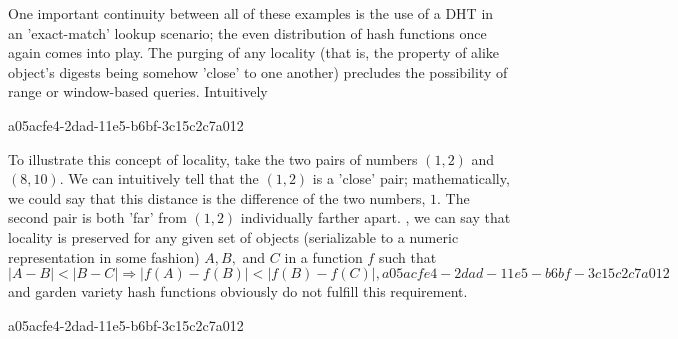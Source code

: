 \documentclass[12pt]{article}
\begin{document}
\par One important continuity between all of these examples is the use of a DHT in an 'exact-match' lookup scenario; the even distribution of hash functions once again comes into play. The purging of any locality (that is, the property of alike object's digests being somehow 'close' to one another) precludes the possibility of range or window-based queries. Intuitively

a05acfe4-2dad-11e5-b6bf-3c15c2c7a012\par To illustrate this concept of locality, take the two pairs of numbers $(1,2)$ and $(8,10)$. We can intuitively tell that the $(1,2)$ is a 'close' pair; mathematically, we could say that this distance is the difference of the two numbers, $1$. The second pair is both 'far' from $(1,2)$ individually farther apart. , we can say that locality is preserved for any given set of objects (serializable to a numeric representation in some fashion) $A,B,$ and $C$ in a function $f$ such that
\begin{equation}
|A-B| < |B-C| \Rightarrow |f(A)-f(B)| < |f(B) - f(C)|,
a05acfe4-2dad-11e5-b6bf-3c15c2c7a012\end{equation}
and garden variety hash functions obviously do not fulfill this requirement.

\printbibliography
a05acfe4-2dad-11e5-b6bf-3c15c2c7a012
\end{document}
